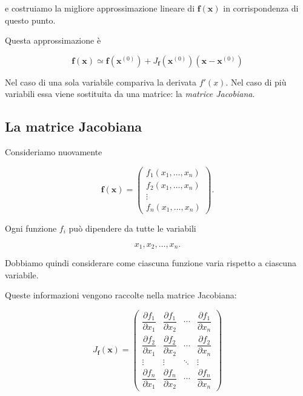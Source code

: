 e costruiamo la migliore approssimazione lineare di
$\mathbf{f}(\mathbf{x})$ in corrispondenza di questo punto.

Questa approssimazione è

\begin{equation*}
\mathbf{f}(\mathbf{x})
\simeq
\mathbf{f}(\mathbf{x}^{(0)})
+
J_{\mathbf{f}}(\mathbf{x}^{(0)})
\left(
\mathbf{x}-\mathbf{x}^{(0)}
\right)
\label{eq:linearization-vector}
\end{equation*}

Nel caso di una sola variabile compariva la derivata $f'(x)$.
Nel caso di più variabili essa viene sostituita da una matrice:
la \emph{matrice Jacobiana}.


\subsection{La matrice Jacobiana}

Consideriamo nuovamente

\begin{equation*}
\mathbf{f}(\mathbf{x})
=
\begin{pmatrix}
f_1(x_1,\ldots,x_n)\\
f_2(x_1,\ldots,x_n)\\
\vdots\\
f_n(x_1,\ldots,x_n)
\end{pmatrix}.
\end{equation*}

Ogni funzione $f_i$ può dipendere da tutte le variabili

\begin{equation*}
    x_1,x_2,\ldots,x_n.
\end{equation*}

Dobbiamo quindi considerare come ciascuna funzione varia rispetto a
ciascuna variabile.

Queste informazioni vengono raccolte nella matrice Jacobiana:

\begin{equation*}
J_{\mathbf{f}}(\mathbf{x})
=
\begin{pmatrix}
\dfrac{\partial f_1}{\partial x_1}
&
\dfrac{\partial f_1}{\partial x_2}
&
\cdots
&
\dfrac{\partial f_1}{\partial x_n}
\\[3mm]
\dfrac{\partial f_2}{\partial x_1}
&
\dfrac{\partial f_2}{\partial x_2}
&
\cdots
&
\dfrac{\partial f_2}{\partial x_n}
\\
\vdots & \vdots & \ddots & \vdots
\\[2mm]
\dfrac{\partial f_n}{\partial x_1}
&
\dfrac{\partial f_n}{\partial x_2}
&
\cdots
&
\dfrac{\partial f_n}{\partial x_n}
\end{pmatrix}
\label{eq:jacobian}
\end{equation*}

